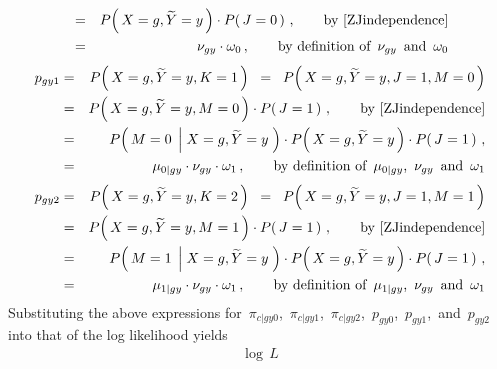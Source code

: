 \begin{enumerate}
\begin{eqnarray*}
\\
&=&
	P\!\left(\,X=g,\widetilde{Y}=y\,\right)
	\cdot
	P\!\left(\,J=0\,\right)\,,
	\quad\quad
	\textnormal{by \eqref{ZJindependence}}
\\
&=&
	\nu_{gy}
	\cdot
	\omega_{0}\,,
	\quad\quad
	\textnormal{by definition of \,$\nu_{gy}$\, and \,$\omega_{0}$}
\end{eqnarray*}
\begin{eqnarray*}
p_{gy1}
&=&
	P\!\left(\,X=g,\widetilde{Y}=y,K=1\,\right)
\;\;=\;\;
	P\!\left(\,X=g,\widetilde{Y}=y,J=1,M=0\,\right)
\\
&=&
	P\!\left(\,X=g,\widetilde{Y}=y,M=0\,\right)
	\cdot
	P\!\left(\,J=1\,\right)\,,
	\quad\quad
	\textnormal{by \eqref{ZJindependence}}
\\
&=&
	P\!\left(\,M=0\;\left\vert\;X=g,\widetilde{Y}=y\right.\,\right)
	\cdot
	P\!\left(\,X=g,\widetilde{Y}=y\,\right)
	\cdot
	P\!\left(\,J=1\,\right)\,,
\\
&=&
	\mu_{0 \vert gy}
	\cdot
	\nu_{gy}
	\cdot
	\omega_{1}\,,
	\quad\quad
	\textnormal{by definition of \,$\mu_{0 \vert gy}$, \,$\nu_{gy}$\, and \,$\omega_{1}$}
\end{eqnarray*}
\begin{eqnarray*}
p_{gy2}
&=&
	P\!\left(\,X=g,\widetilde{Y}=y,K=2\,\right)
\;\;=\;\;
	P\!\left(\,X=g,\widetilde{Y}=y,J=1,M=1\,\right)
\\
&=&
	P\!\left(\,X=g,\widetilde{Y}=y,M=1\,\right)
	\cdot
	P\!\left(\,J=1\,\right)\,,
	\quad\quad
	\textnormal{by \eqref{ZJindependence}}
\\
&=&
	P\!\left(\,M=1\;\left\vert\;X=g,\widetilde{Y}=y\right.\,\right)
	\cdot
	P\!\left(\,X=g,\widetilde{Y}=y\,\right)
	\cdot
	P\!\left(\,J=1\,\right)\,,
\\
&=&
	\mu_{1 \vert gy}
	\cdot
	\nu_{gy}
	\cdot
	\omega_{1}\,,
	\quad\quad
	\textnormal{by definition of \,$\mu_{1 \vert gy}$, \,$\nu_{gy}$\, and \,$\omega_{1}$}
\end{eqnarray*}
Substituting the above expressions for
\,$\pi_{c \vert gy0}$,
\,$\pi_{c \vert gy1}$,
\,$\pi_{c \vert gy2}$,
\,$p_{gy0}$,
\,$p_{gy1}$,
\,and
\,$p_{gy2}$
\,into that of the log likelihood yields
\begin{eqnarray*}
\log\,L

\end{eqnarray*}
\end{enumerate}
